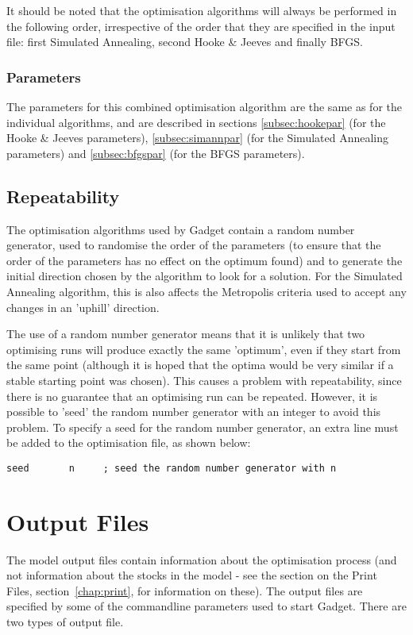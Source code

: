 \documentclass[10pt,twoside]{book}
\begin{document}
It should be noted that the optimisation algorithms will always be performed in the following order, irrespective of the order that they are specified in the input file: first Simulated Annealing, second Hooke \& Jeeves and finally BFGS.

\subsection{Parameters}\label{subsec:combinepar}
The parameters for this combined optimisation algorithm are the same as for the individual algorithms, and are described in sections \ref{subsec:hookepar} (for the Hooke \& Jeeves parameters), \ref{subsec:simannpar} (for the Simulated Annealing parameters) and \ref{subsec:bfgspar} (for the BFGS parameters).

\section{Repeatability}\label{sec:repeat}
The optimisation algorithms used by Gadget contain a random number generator, used to randomise the order of the parameters (to ensure that the order of the parameters has no effect on the optimum found) and to generate the initial direction chosen by the algorithm to look for a solution.  For the Simulated Annealing algorithm, this is also affects the Metropolis criteria used to accept any changes in an 'uphill' direction.

\bigskip
The use of a random number generator means that it is unlikely that two optimising runs will produce exactly the same 'optimum', even if they start from the same point (although it is hoped that the optima would be very similar if a stable starting point was chosen).  This causes a problem with repeatability, since there is no guarantee that an optimising run can be repeated.  However, it is possible to 'seed' the random number generator with an integer to avoid this problem.  To specify a seed for the random number generator, an extra line must be added to the optimisation file, as shown below:

{\small\begin{verbatim}
seed       n     ; seed the random number generator with n
\end{verbatim}}

\chapter{Output Files}\label{chap:output}
The model output files contain information about the optimisation process (and not information about the stocks in the model - see the section on the Print Files, section~\ref{chap:print}, for information on these).  The output files are specified by some of the commandline parameters used to start Gadget.  There are two types of output file.
\end{document}
